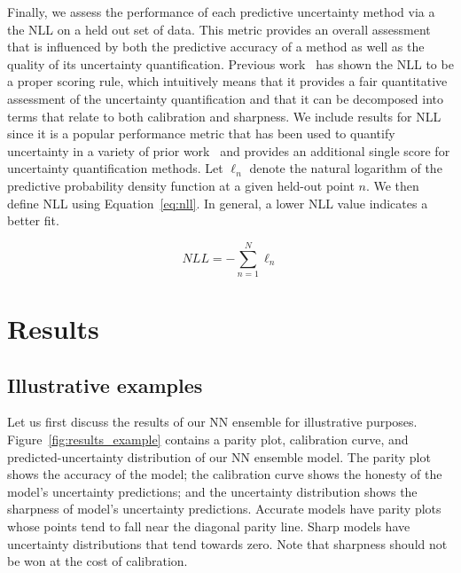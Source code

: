 \documentclass[]{achemso}
\begin{document}
Finally, we assess the performance of each predictive uncertainty method via a the \gls{NLL} on a held out set of data.
This metric provides an overall assessment that is influenced by both the predictive accuracy of a method as well as the quality of its uncertainty quantification.
Previous work~\cite{} has shown the \gls{NLL} to be a proper scoring rule, which intuitively means that it provides a fair quantitative assessment of the uncertainty quantification and that it can be decomposed into terms that relate to both calibration and sharpness.
We include results for \gls{NLL} since it is a popular performance metric that has been used to quantify uncertainty in a variety of prior work~\cite{} and provides an additional single score for uncertainty quantification methods.
Let $\ell_n$ denote the natural logarithm of the predictive probability density function at a given held-out point $n$.
We then define \gls{NLL} using Equation~\ref{eq:nll}.
In general, a lower \gls{NLL} value indicates a better fit.

\begin{equation}\label{eq:nll}
  NLL = - \sum_{n=1}^{N} \ell_n
\end{equation}



\section{Results}

\subsection{Illustrative examples}

Let us first discuss the results of our \gls{NN} ensemble for illustrative purposes.
Figure~\ref{fig:results_example} contains a parity plot, calibration curve, and predicted-uncertainty distribution of our \gls{NN} ensemble model.
The parity plot shows the accuracy of the model; the calibration curve shows the honesty of the model's uncertainty predictions; and the uncertainty distribution shows the sharpness of model's uncertainty predictions.
Accurate models have parity plots whose points tend to fall near the diagonal parity line.
Sharp models have uncertainty distributions that tend towards zero.
Note that sharpness should not be won at the cost of calibration.
\end{document}
